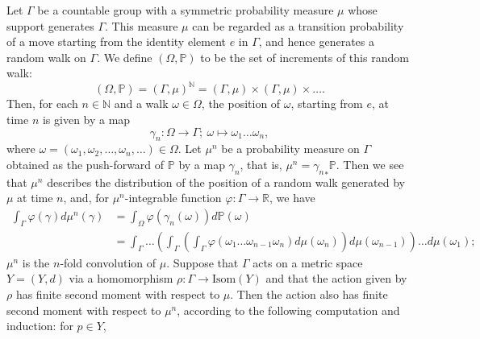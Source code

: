 \documentclass[12pt]{amsart}
\numberwithin{equation}{section}
\theoremstyle{plain}
\theoremstyle{definition}
\theoremstyle{remark}
\newcommand{\R}{{\mathbb R}}
\newcommand{\N}{{\mathbb N}}
\newcommand{\isom}[1]{\mathrm{Isom}({#1})}
\begin{document}
%
%
Let $\Gamma$ be a countable group with a symmetric probability
measure $\mu$ whose support generates $\Gamma$. 
This measure $\mu$ can be regarded as a transition probability of a move
starting from the identity element $e$ in $\Gamma$, and hence generates
a random walk on $\Gamma$. 
We define $(\Omega, \mathbb{P})$ to be 
the set of increments of this random walk:
\begin{equation*}
 (\Omega, \mathbb{P})=(\Gamma,\mu)^{\N}=
 (\Gamma, \mu) \times (\Gamma, \mu) \times \dots. 
\end{equation*}
Then, for each $n \in \N$ and a walk $\omega \in \Omega$, 
the position of $\omega$, starting from $e$, at time $n$ is given by a
map 
\begin{equation*}
 \gamma_n \colon \Omega \rightarrow \Gamma; \ 
 \omega \mapsto \omega_1 \dots \omega_n, 
\end{equation*}
where $\omega=(\omega_1, \omega_2, \dots, \omega_n, \dots) \in \Omega$.
Let $\mu^n$ be a probability measure on $\Gamma$ obtained as the
push-forward of $\mathbb{P}$ by a map $\gamma_n$, that is, 
$\mu^n ={\gamma_n}_* \mathbb{P}$. 
Then we see that $\mu^n$ describes the distribution of the position of a
random walk generated by $\mu$ at time $n$,
and, for $\mu^n$-integrable function
$\varphi\colon \Gamma \rightarrow \R$, we have
\begin{equation*}
\begin{split}
  \int_{\Gamma} \varphi(\gamma) d\mu^n(\gamma)
 & = \int_{\Omega} \varphi(\gamma_n(\omega)) d\mathbb{P}(\omega) \\
 & = \int_{\Gamma}\dots \left(\int_{\Gamma}\left(
  \int_{\Gamma} \varphi (\omega_1 \dots \omega_{n-1}\omega_n) 
  d\mu(\omega_n)\right) 
d\mu(\omega_{n-1})\right) \dots d\mu(\omega_1);
\end{split}
\end{equation*}
$\mu^n$ is the $n$-fold convolution of $\mu$. 
Suppose that $\Gamma$ acts on a metric space $Y=(Y,d)$ via a
homomorphism $\rho\colon \Gamma \rightarrow \isom{Y}$ and that the
action given by $\rho$ has finite second moment with respect to $\mu$. 
Then the action also has finite second moment with respect to
$\mu^n$, according to the following computation and induction:
for $p \in Y$, 
\end{document}
